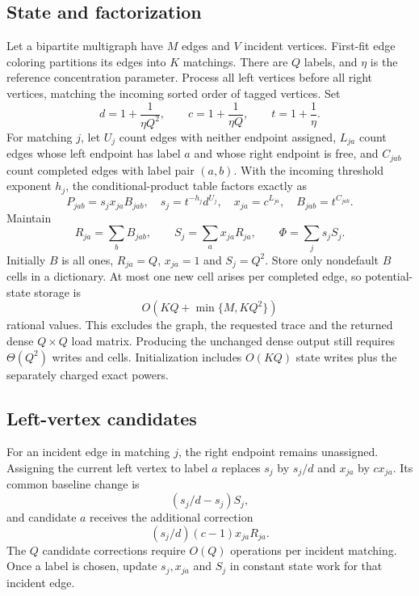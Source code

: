 \documentclass[11pt,letterpaper]{article}
\theoremstyle{remark}\newtheorem{remark}[theorem]{Remark}
\begin{document}
\subsection{State and factorization}
Let a bipartite multigraph have $M$ edges and $V$ incident vertices. First-fit edge coloring partitions its edges into $K$ matchings. There are $Q$ labels, and $\eta$ is the reference concentration parameter. Process all left vertices before all right vertices, matching the incoming sorted order of tagged vertices. Set
\[
 d=1+\frac1{\eta Q^2},\qquad
 c=1+\frac1{\eta Q},\qquad
 t=1+\frac1\eta.
\]
For matching $j$, let $U_j$ count edges with neither endpoint assigned, $L_{ja}$ count edges whose left endpoint has label $a$ and whose right endpoint is free, and $C_{jab}$ count completed edges with label pair $(a,b)$. With the incoming threshold exponent $h_j$, the conditional-product table factors exactly as
\begin{equation}\label{eq:factor}
 P_{jab}=s_jx_{ja}B_{jab},\quad
 s_j=t^{-h_j}d^{U_j},\quad x_{ja}=c^{L_{ja}},\quad B_{jab}=t^{C_{jab}}.
\end{equation}
Maintain
\[
 R_{ja}=\sum_bB_{jab},\qquad
 S_j=\sum_ax_{ja}R_{ja},\qquad
 \Phi=\sum_js_jS_j.
\]
Initially $B$ is all ones, $R_{ja}=Q$, $x_{ja}=1$ and $S_j=Q^2$. Store only nondefault $B$ cells in a dictionary. At most one new cell arises per completed edge, so potential-state storage is
\begin{equation}\label{eq:matchspace}
 O\!\left(KQ+\min\{M,KQ^2\}\right)
\end{equation}
rational values. This excludes the graph, the requested trace and the returned dense $Q\times Q$ load matrix. Producing the unchanged dense output still requires $\Theta(Q^2)$ writes and cells. Initialization includes $O(KQ)$ state writes plus the separately charged exact powers.

\subsection{Left-vertex candidates}
For an incident edge in matching $j$, the right endpoint remains unassigned. Assigning the current left vertex to label $a$ replaces $s_j$ by $s_j/d$ and $x_{ja}$ by $cx_{ja}$. Its common baseline change is
\[
 (s_j/d-s_j)S_j,
\]
and candidate $a$ receives the additional correction
\begin{equation}\label{eq:leftdelta}
 (s_j/d)(c-1)x_{ja}R_{ja}.
\end{equation}
The $Q$ candidate corrections require $O(Q)$ operations per incident matching. Once a label is chosen, update $s_j,x_{ja}$ and $S_j$ in constant state work for that incident edge.
\end{document}
